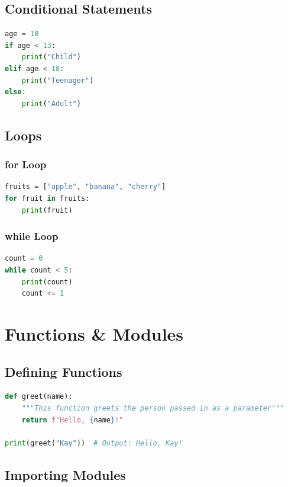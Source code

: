 \documentclass{article}
\begin{document}
\subsection{Conditional Statements}

\begin{lstlisting}[language=Python]
age = 18
if age < 13:
    print("Child")
elif age < 18:
    print("Teenager")
else:
    print("Adult")
\end{lstlisting}

\subsection{Loops}

\subsubsection{for Loop}

\begin{lstlisting}[language=Python]
fruits = ["apple", "banana", "cherry"]
for fruit in fruits:
    print(fruit)
\end{lstlisting}

\subsubsection{while Loop}

\begin{lstlisting}[language=Python]
count = 0
while count < 5:
    print(count)
    count += 1
\end{lstlisting}

\section{Functions \& Modules}

\subsection{Defining Functions}

\begin{lstlisting}[language=Python]
def greet(name):
    """This function greets the person passed in as a parameter"""
    return f"Hello, {name}!"

print(greet("Kay"))  # Output: Hello, Kay!
\end{lstlisting}

\subsection{Importing Modules}
\end{document}
